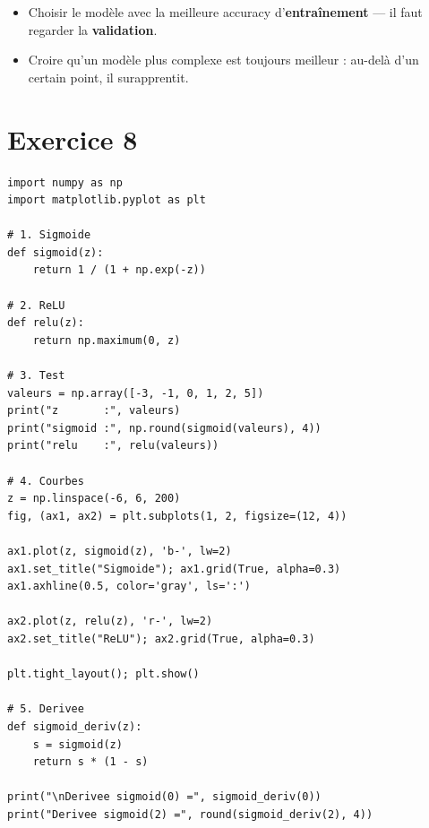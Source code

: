 \begin{attentionbox}
\begin{itemize}
    \item Choisir le mod\`{e}le avec la meilleure accuracy d'\textbf{entra\^{i}nement} --- il faut regarder la \textbf{validation}.
    \item Croire qu'un mod\`{e}le plus complexe est toujours meilleur : au-del\`{a} d'un certain point, il surapprentit.
\end{itemize}
\end{attentionbox}

\section*{Exercice 8 \hfill \exointermediaire}

\separateur

\begin{pythonbox}
\begin{lstlisting}
import numpy as np
import matplotlib.pyplot as plt

# 1. Sigmoide
def sigmoid(z):
    return 1 / (1 + np.exp(-z))

# 2. ReLU
def relu(z):
    return np.maximum(0, z)

# 3. Test
valeurs = np.array([-3, -1, 0, 1, 2, 5])
print("z       :", valeurs)
print("sigmoid :", np.round(sigmoid(valeurs), 4))
print("relu    :", relu(valeurs))

# 4. Courbes
z = np.linspace(-6, 6, 200)
fig, (ax1, ax2) = plt.subplots(1, 2, figsize=(12, 4))

ax1.plot(z, sigmoid(z), 'b-', lw=2)
ax1.set_title("Sigmoide"); ax1.grid(True, alpha=0.3)
ax1.axhline(0.5, color='gray', ls=':')

ax2.plot(z, relu(z), 'r-', lw=2)
ax2.set_title("ReLU"); ax2.grid(True, alpha=0.3)

plt.tight_layout(); plt.show()

# 5. Derivee
def sigmoid_deriv(z):
    s = sigmoid(z)
    return s * (1 - s)

print("\nDerivee sigmoid(0) =", sigmoid_deriv(0))
print("Derivee sigmoid(2) =", round(sigmoid_deriv(2), 4))
\end{lstlisting}
\end{pythonbox}

